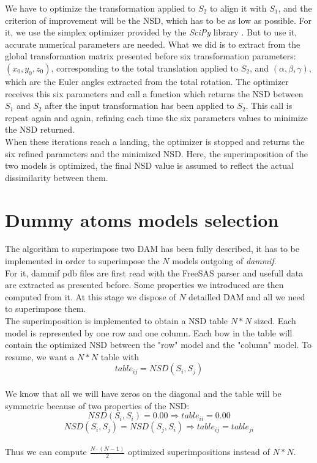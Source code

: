 \documentclass[a4paper, 11pt]{report}
\begin{document}
We have to optimize the transformation applied to $S_{2}$ to align it 
with $S_{1}$, and the criterion of improvement will be the NSD, which 
has to be as low as possible. 
For it, we use the simplex optimizer provided by the \textit{SciPy} 
library \cite{scipy}. 
But to use it, accurate numerical parameters are needed. 
What we did is to extract from the global transformation matrix 
presented before six transformation parameters: 
$(x_{0}, y_{0}, z_{0})$, 
corresponding to the total translation applied to $S_{2}$, and 
$(\alpha, \beta, \gamma)$, 
which are the Euler angles extracted from the total rotation. 
The optimizer receives this six parameters and call a function which 
returns the NSD between $S_{1}$ and $S_{2}$ after the input 
transformation has been applied to $S_{2}$. 
This call is repeat again and again, refining each time the six 
parameters values to minimize the NSD returned.\\
When these iterations reach a landing, the optimizer is stopped and 
returns the six refined parameters and the minimized NSD. 
Here, the superimposition of the two models is optimized, the final 
NSD value is assumed to reflect the actual dissimilarity between them.\\

\section{Dummy atoms models selection}

The algorithm to superimpose two DAM has been fully described, it has 
to be implemented in order to superimpose the $N$ models outgoing of 
\textit{dammif}. \\

For it, dammif pdb files are first read with the FreeSAS parser and 
usefull data are extracted as presented before. 
Some properties we introduced are then computed from it. 
At this stage we dispose of $N$ detailled DAM and all we need to 
superimpose them.\\
The superimposition is implemented to obtain a NSD table $N*N$ sized. 
Each model is represented by one row and one column. 
Each bow in the table will contain the optimized NSD between the "row" 
model and the "column" model. 
To resume, we want a $N*N$ table with 
\[
table_{ij}=NSD(S_{i},S_{j})
\]\\ 
We know that all we will have zeros on the diagonal and the table will 
be symmetric because of two properties of the NSD:
\[
NSD(S_{i},S_{i})=0.00 \Rightarrow table_{ii}=0.00
\]
\[
NSD(S_{i},S_{j}) = NSD(S_{j},S_{i}) \Rightarrow table_{ij}=table_{ji}
\]\\
Thus we can compute $\frac{N \cdot (N-1)}{2}$ optimized 
superimpositions instead of $N*N$.\\
\end{document}
